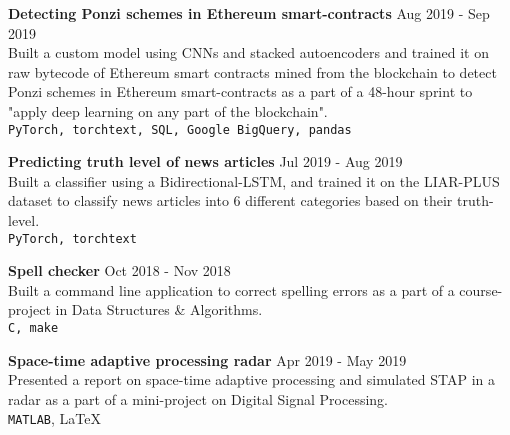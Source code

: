 \documentclass[letterpaper]{article}
\renewenvironment{itemize}{
  \begin{list}{}{
    \setlength{\leftmargin}{1.5em}
  }
}{
  \end{list}
}
\newcommand{\smallGreyFont}[1]{\textcolor{black!80}{\small{#1}}}
\begin{document}
\begin{itemize}
    \item
    \textbf{Detecting Ponzi schemes in Ethereum smart-contracts}
    \hfill{\smallGreyFont{Aug 2019 - Sep 2019}}\\
      Built a custom model using CNNs and stacked autoencoders and trained it on raw bytecode of Ethereum smart contracts mined from the blockchain to detect Ponzi schemes in Ethereum smart-contracts as a part of a 48-hour sprint to "apply deep learning on any part of the blockchain".\\
      \texttt{\smallGreyFont{PyTorch, torchtext, SQL, Google BigQuery, pandas}}

    \item
    \textbf{Predicting truth level of news articles}
    \hfill{\smallGreyFont{Jul 2019 - Aug 2019}}\\
      Built a classifier using a Bidirectional-LSTM, and trained it on the LIAR-PLUS dataset to classify news articles into 6 different categories based on their truth-level.\\
      \texttt{\smallGreyFont{PyTorch, torchtext}}

    \item
    \textbf{Spell checker}
    \hfill{\smallGreyFont{Oct 2018 - Nov 2018}}\\
      Built a command line application to correct spelling errors as a part of a course-project in Data Structures \& Algorithms.\\
      \texttt{\smallGreyFont{C, make}}

    \item
    \textbf{Space-time adaptive processing radar}
    \hfill{\smallGreyFont{Apr 2019 - May 2019}}\\
      Presented a report on space-time adaptive processing and simulated STAP in a radar as a part of a mini-project on Digital Signal Processing.\\
      \smallGreyFont{\texttt{MATLAB}, \LaTeX}

  \end{itemize}


\end{document}
